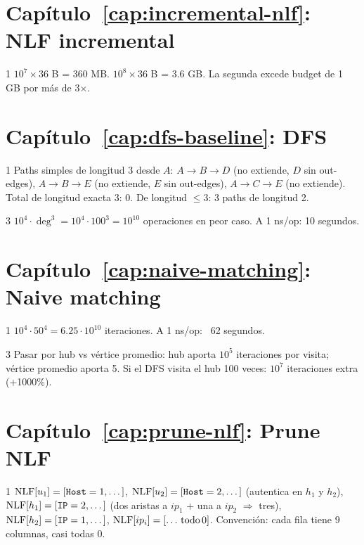 \section*{Capítulo~\ref{cap:incremental-nlf}: NLF incremental}

\begin{solucion}{1}
\(10^7 \times 36\) B = 360 MB. \(10^8 \times 36\) B = 3.6 GB.
La segunda excede budget de 1 GB por más de 3$\times$.
\end{solucion}

\section*{Capítulo~\ref{cap:dfs-baseline}: DFS}

\begin{solucion}{1}
Paths simples de longitud 3 desde \(A\):
\(A \to B \to D\) (no extiende, \(D\) sin out-edges),
\(A \to B \to E\) (no extiende, \(E\) sin out-edges),
\(A \to C \to E\) (no extiende). Total de longitud exacta 3:
0. De longitud \(\leq 3\): 3 paths de longitud 2.
\end{solucion}

\begin{solucion}{3}
\(10^4 \cdot \deg^3 = 10^4 \cdot 100^3 = 10^{10}\) operaciones
en peor caso. A 1 ns/op: 10 segundos.
\end{solucion}

\section*{Capítulo~\ref{cap:naive-matching}: Naive matching}

\begin{solucion}{1}
\(10^4 \cdot 50^4 = 6.25 \cdot 10^{10}\) iteraciones. A 1 ns/op:
~62 segundos.
\end{solucion}

\begin{solucion}{3}
Pasar por hub vs vértice promedio: hub aporta \(10^5\)
iteraciones por visita; vértice promedio aporta 5. Si el DFS
visita el hub 100 veces: \(10^7\) iteraciones extra (+1000\%).
\end{solucion}

\section*{Capítulo~\ref{cap:prune-nlf}: Prune NLF}

\begin{solucion}{1}
\(\mathrm{NLF}[u_1] = [\texttt{Host}=1, \dots]\),
\(\mathrm{NLF}[u_2] = [\texttt{Host}=2, \dots]\) (autentica en \(h_1\) y
\(h_2\)),
\(\mathrm{NLF}[h_1] = [\texttt{IP}=2, \dots]\) (dos aristas a \(ip_1\) +
una a \(ip_2\) $\Rightarrow$ tres),
\(\mathrm{NLF}[h_2] = [\texttt{IP}=1, \dots]\),
\(\mathrm{NLF}[ip_i] = [\dots\,\text{todo}\,0]\). Convención: cada fila
tiene 9 columnas, casi todas 0.
\end{solucion}

